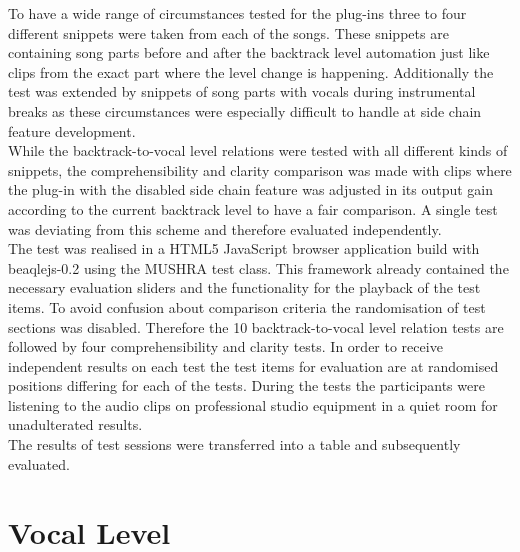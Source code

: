 To have a wide range of circumstances tested for the plug-ins three to four different snippets were taken from each of the songs. These snippets are containing song parts before and after the backtrack level automation just like clips from the exact part where the level change is happening. Additionally the test was extended by snippets of song parts with vocals during instrumental breaks as these circumstances were especially difficult to handle at side chain feature development.\\
While the backtrack-to-vocal level relations were tested with all different kinds of snippets, the comprehensibility and clarity comparison was made with clips where the plug-in with the disabled side chain feature was adjusted in its output gain according to the current backtrack level to have a fair comparison. A single test was deviating from this scheme and therefore evaluated independently.\\
The test was realised in a HTML5 JavaScript browser application build with beaqlejs-0.2\cite{beaqleJS} using the MUSHRA test class. This framework already contained the necessary evaluation sliders and the functionality for the playback of the test items. To avoid confusion about comparison criteria the randomisation of test sections was disabled. Therefore the 10 backtrack-to-vocal level relation tests are followed by four comprehensibility and clarity tests. In order to receive independent results on each test the test items for evaluation are at randomised positions differing for each of the tests. During the tests the participants were listening to the audio clips on professional studio equipment in a quiet room for unadulterated results.\\
The results of test sessions were transferred into a table and subsequently evaluated.\\

\section{Vocal Level}

